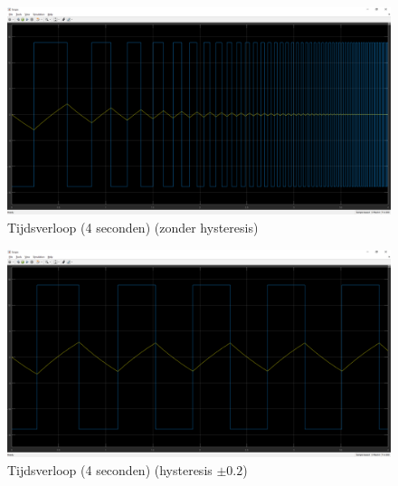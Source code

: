 \documentclass[12pt]{article}
\begin{document}
\begin{figure}[!h]
	\centering
	\includegraphics[width=\textwidth, keepaspectratio]{tijdnohysopgave2.png}
	\caption{Tijdsverloop (4 seconden) (zonder hysteresis)}
	\label{tijdnohysopgave2}
\end{figure}
\begin{figure}[!h]
	\centering
	\includegraphics[width=\textwidth, keepaspectratio]{tijdhysopgave2.png}
	\caption{Tijdsverloop (4 seconden) (hysteresis $\pm 0.2$)}
	\label{tijdhysopgave2}
\end{figure}
\end{document}
